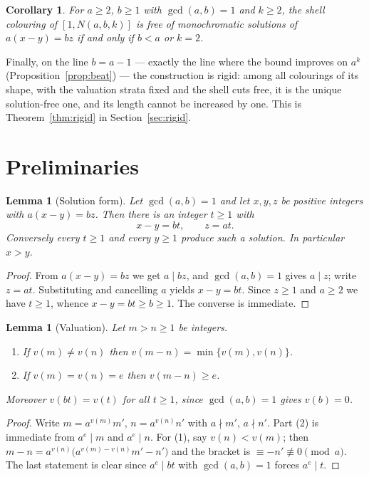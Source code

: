 \documentclass{amsart}
\newtheorem{lemma}[theorem]{Lemma}
\newtheorem{corollary}[theorem]{Corollary}
\theoremstyle{definition}
\begin{document}
\begin{corollary}\label{cor:iff}
For $a\ge2$, $b\ge1$ with $\gcd(a,b)=1$ and $k\ge2$, the shell colouring of
$[1,N(a,b,k)]$ is free of monochromatic solutions of $a(x-y)=bz$ if and only if
$b<a$ or $k=2$.
\end{corollary}

Finally, on the line $b=a-1$ --- exactly the line where the bound improves on
$a^{k}$ (Proposition~\ref{prop:beat}) --- the construction is rigid: among all
colourings of its shape, with the valuation strata fixed and the shell cuts
free, it is the unique solution-free one, and its length cannot be increased by
one.  This is Theorem~\ref{thm:rigid} in Section~\ref{sec:rigid}.

\section{Preliminaries}

\begin{lemma}[Solution form]\label{lem:solform}
Let $\gcd(a,b)=1$ and let $x,y,z$ be positive integers with $a(x-y)=bz$.  Then
there is an integer $t\ge1$ with
\[
  x-y=bt,\qquad z=at .
\]
Conversely every $t\ge1$ and every $y\ge1$ produce such a solution.  In
particular $x>y$.
\end{lemma}

\begin{proof}
From $a(x-y)=bz$ we get $a\mid bz$, and $\gcd(a,b)=1$ gives $a\mid z$; write
$z=at$.  Substituting and cancelling $a$ yields $x-y=bt$.  Since $z\ge1$ and
$a\ge2$ we have $t\ge1$, whence $x-y=bt\ge b\ge1$.  The converse is immediate.
\end{proof}

\begin{lemma}[Valuation]\label{lem:val}
Let $m>n\ge1$ be integers.
\begin{enumerate}
\item If $v(m)\ne v(n)$ then $v(m-n)=\min\{v(m),v(n)\}$.
\item If $v(m)=v(n)=e$ then $v(m-n)\ge e$.
\end{enumerate}
Moreover $v(bt)=v(t)$ for all $t\ge1$, since $\gcd(a,b)=1$ gives $v(b)=0$.
\end{lemma}

\begin{proof}
Write $m=a^{v(m)}m'$, $n=a^{v(n)}n'$ with $a\nmid m'$, $a\nmid n'$.  Part (2)
is immediate from $a^e\mid m$ and $a^e\mid n$.  For (1), say $v(n)<v(m)$; then
$m-n=a^{v(n)}\bigl(a^{v(m)-v(n)}m'-n'\bigr)$ and the bracket is $\equiv -n'
\not\equiv0 \pmod a$.  The last statement is clear since $a^e\mid bt$ with
$\gcd(a,b)=1$ forces $a^e\mid t$.
\end{proof}
\end{document}
